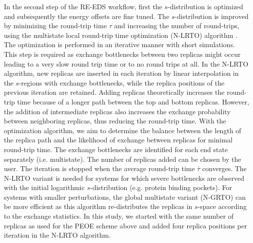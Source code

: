 In the second step of the RE-EDS workflow, first the $s$-distribution is optimized and subsequently the energy offsets are fine tuned.
%
The $s$-distribution is improved by minimizing the round-trip time $\tau$ and increasing the number of round-trips, using the multistate local round-trip time optimization (N-LRTO) algorithm \cite{Sidler2017}. The optimization is performed in an iterative manner with short simulations.
This step is required as exchange bottlenecks between two replicas might occur leading to a very slow round trip time or to no round trips at all. 
In the N-LRTO algorithm, new replicas are inserted in each iteration by linear interpolation in the $s$-regions with exchange bottlenecks, while the replica positions of the previous iteration are retained. Adding replicas theoretically increases the round-trip time because of a longer path between the top and bottom replicas. However, the addition of intermediate replicas also increases the exchange probability between neighboring replicas, thus reducing the round-trip time. With the optimization algorithm, we aim to determine the balance between the length of the replica path and the likelihood of exchange between replicas for minimal round-trip time. The exchange bottlenecks are identified for each end state separately (i.e. multistate). The number of replicas added can be chosen by the user. The iteration is stopped when the average round-trip time $\overline{\tau}$ converges. 
The N-LRTO variant is needed for systems for which severe bottlenecks are observed with the initial logarithmic $s$-distribution (e.g. protein binding pockets). For systems with smaller perturbations, the global multistate variant (N-GRTO) \cite{Sidler2017} can be more efficient as this algorithm re-distributes the replicas in $s$-space according to the exchange statistics. %
%
In this study, we started with the same number of replicas as used for the PEOE scheme above and added four replica positions per iteration in the N-LRTO algorithm.

